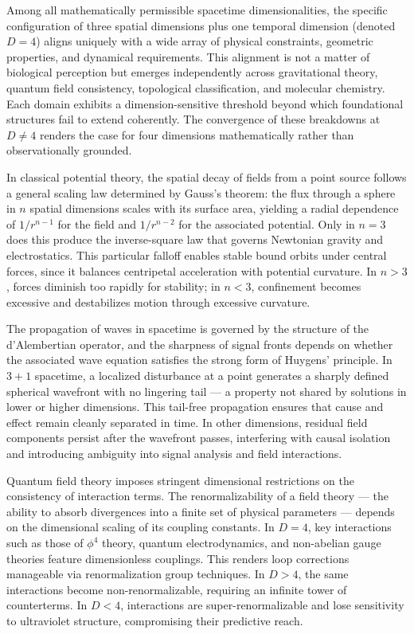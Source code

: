 
Among all mathematically permissible spacetime dimensionalities, the specific configuration of three spatial dimensions plus one temporal dimension (denoted $D=4$) aligns uniquely with a wide array of physical constraints, geometric properties, and dynamical requirements. This alignment is not a matter of biological perception but emerges independently across gravitational theory, quantum field consistency, topological classification, and molecular chemistry. Each domain exhibits a dimension-sensitive threshold beyond which foundational structures fail to extend coherently. The convergence of these breakdowns at $D \ne 4$ renders the case for four dimensions mathematically rather than observationally grounded.

In classical potential theory, the spatial decay of fields from a point source follows a general scaling law determined by Gauss’s theorem: the flux through a sphere in $n$ spatial dimensions scales with its surface area, yielding a radial dependence of $1/r^{n-1}$ for the field and $1/r^{n-2}$ for the associated potential. Only in $n=3$ does this produce the inverse-square law that governs Newtonian gravity and electrostatics. This particular falloff enables stable bound orbits under central forces, since it balances centripetal acceleration with potential curvature. In $n>3$, forces diminish too rapidly for stability; in $n<3$, confinement becomes excessive and destabilizes motion through excessive curvature.

The propagation of waves in spacetime is governed by the structure of the d'Alembertian operator, and the sharpness of signal fronts depends on whether the associated wave equation satisfies the strong form of Huygens’ principle. In $3+1$ spacetime, a localized disturbance at a point generates a sharply defined spherical wavefront with no lingering tail — a property not shared by solutions in lower or higher dimensions. This tail-free propagation ensures that cause and effect remain cleanly separated in time. In other dimensions, residual field components persist after the wavefront passes, interfering with causal isolation and introducing ambiguity into signal analysis and field interactions.

Quantum field theory imposes stringent dimensional restrictions on the consistency of interaction terms. The renormalizability of a field theory — the ability to absorb divergences into a finite set of physical parameters — depends on the dimensional scaling of its coupling constants. In $D=4$, key interactions such as those of $\phi^4$ theory, quantum electrodynamics, and non-abelian gauge theories feature dimensionless couplings. This renders loop corrections manageable via renormalization group techniques. In $D>4$, the same interactions become non-renormalizable, requiring an infinite tower of counterterms. In $D<4$, interactions are super-renormalizable and lose sensitivity to ultraviolet structure, compromising their predictive reach.

